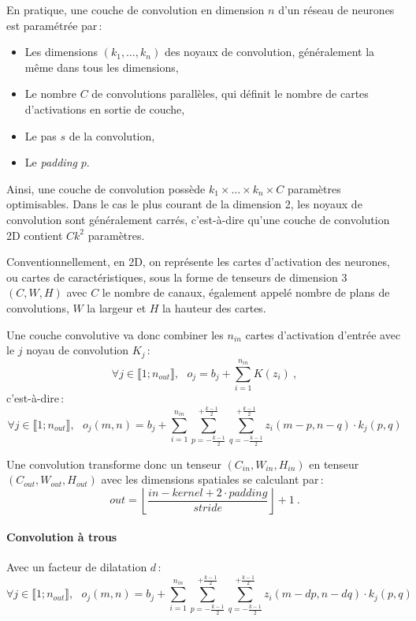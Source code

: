 En pratique, une couche de convolution en dimension $n$ d'un réseau de neurones est paramétrée par\,:
\begin{itemize}
  \item Les dimensions $(k_1, \dots, k_n)$ des noyaux de convolution, généralement la même dans tous les dimensions,
  \item Le nombre $C$ de convolutions parallèles, qui définit le nombre de cartes d'activations en sortie de couche,
  \item Le pas $s$ de la convolution,
  \item Le \emph{padding} $p$.
\end{itemize}

Ainsi, une couche de convolution possède $k_1 \times \dots \times k_n \times C$ paramètres optimisables. Dans le cas le plus courant de la dimension 2, les noyaux de convolution sont généralement carrés, c'est-à-dire qu'une couche de convolution 2D contient $C k^2$ paramètres.

Conventionnellement, en 2D, on représente les cartes d'activation des neurones, ou cartes de caractéristiques, sous la forme de tenseurs de dimension 3 $(C, W, H)$ avec $C$ le nombre de canaux, également appelé nombre de plans de convolutions, $W$ la largeur et $H$ la hauteur des cartes.

Une couche convolutive va donc combiner les $n_{in}$ cartes d'activation d'entrée avec le $j$\ieme{} noyau de convolution $K_j$\,:
$$\forall j \in \llbracket 1;n_{out} \rrbracket,~~~o_j = b_j + \sum_{i=1}^{n_{in}} K(z_i)~,$$ c'est-à-dire\,:
$$\forall j \in \llbracket 1;n_{out} \rrbracket,~~~o_j(m, n) = b_j + \sum_{i=1}^{n_{in}} \sum_{p=-\frac{k-1}{2}}^{+\frac{k-1}{2}} \sum_{q=-\frac{k-1}{2}}^{+\frac{k-1}{2}} z_i(m - p, n - q) \cdot k_j(p, q)$$

Une convolution transforme donc un tenseur $(C_{in}, W_{in}, H_{in})$ en tenseur $(C_{out}, W_{out}, H_{out})$ avec les dimensions spatiales se calculant par\,:
$$out = \left\lfloor \frac{in - kernel + 2\cdot{}padding}{stride}\right\rfloor + 1~.$$


\paragraph{Convolution à trous}

Avec un facteur de dilatation $d$\,:
$$\forall j \in \llbracket 1;n_{out} \rrbracket,~~~o_j(m, n) = b_j + \sum_{i=1}^{n_{in}} \sum_{p=-\frac{k-1}{2}}^{+\frac{k-1}{2}} \sum_{q=-\frac{k-1}{2}}^{+\frac{k-1}{2}} z_i(m - dp, n - dq) \cdot k_j(p, q)$$

